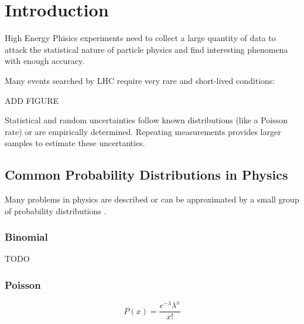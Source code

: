 \chapter{Introduction}










High Energy Phisics experiments need to collect a large quantity of data to attack the statistical nature of particle physics and find interesting phenomena with enough accuracy.

Many events searched by LHC require very rare and short-lived conditions:

ADD FIGURE

Statistical and random uncertainties follow known distributions (like a Poisson rate) or are empirically determined. Repeating measurements provides larger samples to estimate these uncertanties.


\section{Common Probability Distributions in Physics}

Many problems in physics are described or can be approximated by a small group of probability distributions \cite{leo2012techniques}.

\subsection{Binomial}
TODO
\subsection{Poisson}



\begin{equation}
	\label{eqn:poisson}
	P\left( x \right) = \frac{{e^{ - \lambda } \lambda ^x }}{{x!}}
\end{equation}

